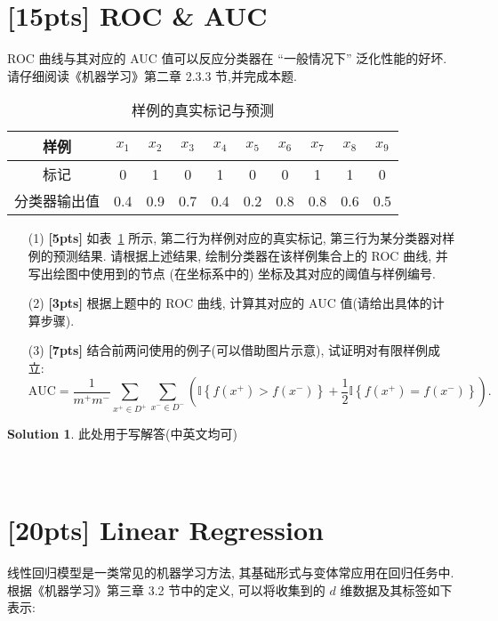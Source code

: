 \documentclass[a4paper,UTF8]{article}
\numberwithin{equation}{section}
\theoremstyle{definition}
\newtheorem*{solution}{Solution}
\begin{document}
\section{[15pts] ROC \& AUC}
 ROC 曲线与其对应的 AUC 值可以反应分类器在 “一般情况下” 泛化性能的好坏. 请仔细阅读《机器学习》第二章 2.3.3 节,并完成本题.
\begin{table}[ht]
	\centering
	\caption{样例的真实标记与预测}
	\begin{tabular}{c|ccccccccc}
		\hline 样例 & $x_1$ & $x_2$ & $x_3$ & $x_4$ & $x_5$ & $x_6$ & $x_7$ & $x_8$ & $x_9$ \\
		\hline 标记 & 0 & 1 & 0 & 1 & 0 & 0 & 1 & 1 & 0 \\
		\hline 分类器输出值 & 0.4 & 0.9 & 0.7 & 0.4 & 0.2 & 0.8 & 0.8 & 0.6 & 0.5 \\
		\hline
	\end{tabular}
	\label{tab:samples}
\end{table} 
\begin{enumerate}
    \item[(1)] \textbf{[5pts]}  如表~\ref{tab:samples} 所示, 第二行为样例对应的真实标记, 第三行为某分类器对样例的预测结果. 请根据上述结果, 绘制分类器在该样例集合上的 ROC 曲线, 并写出绘图中使用到的节点 (在坐标系中的) 坐标及其对应的阈值与样例编号.
    \item[(2)] \textbf{[3pts]}  根据上题中的 ROC 曲线, 计算其对应的 AUC 值(请给出具体的计算步骤).
    \item[(3)] \textbf{[7pts]}  结合前两问使用的例子(可以借助图片示意), 试证明对有限样例成立:
    \begin{equation}
        \label{eq:auc}
            \text{AUC} = \frac{1}{m^+m^-}\sum_{x^+\in D^+}\sum_{x^-\in D^-}\left(\mathbb{I}\left\{f(x^+) > f(x^-)\right\}+\frac{1}{2}\mathbb{I}\left\{f(x^+)=f(x^-)\right\}\right).
    \end{equation}    
\end{enumerate}


\begin{solution}
此处用于写解答(中英文均可)
~\\
~\\
~\\
\end{solution}
\newpage




\section{[20pts] Linear Regression}
 线性回归模型是一类常见的机器学习方法, 其基础形式与变体常应用在回归任务中. 根据《机器学习》第三章 3.2 节中的定义, 可以将收集到的 $d$ 维数据及其标签如下表示: 
\end{document}
